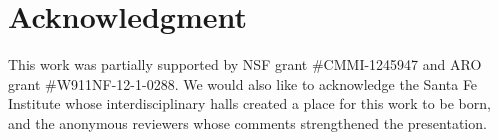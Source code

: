 \documentclass[%
pre,
reprint,
superscriptaddress,
showpacs,
nofootinbib,
nobibnotes,
 amsmath,amssymb,
 aps,
]{revtex4-1}
\begin{document}
\section*{Acknowledgment}
This work was partially supported by NSF grant \#CMMI-1245947 and ARO
grant \#W911NF-12-1-0288.  We would also like to acknowledge the Santa
Fe Institute whose interdisciplinary halls created a place for this
work to be born, and the anonymous reviewers whose comments
strengthened the presentation.




%


\end{document}
